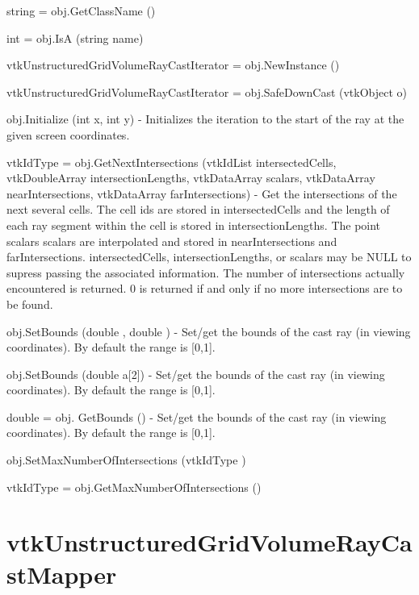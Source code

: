 \begin{DoxyItemize}
\item {\ttfamily string = obj.\-Get\-Class\-Name ()}  
\item {\ttfamily int = obj.\-Is\-A (string name)}  
\item {\ttfamily vtk\-Unstructured\-Grid\-Volume\-Ray\-Cast\-Iterator = obj.\-New\-Instance ()}  
\item {\ttfamily vtk\-Unstructured\-Grid\-Volume\-Ray\-Cast\-Iterator = obj.\-Safe\-Down\-Cast (vtk\-Object o)}  
\item {\ttfamily obj.\-Initialize (int x, int y)} -\/ Initializes the iteration to the start of the ray at the given screen coordinates.  
\item {\ttfamily vtk\-Id\-Type = obj.\-Get\-Next\-Intersections (vtk\-Id\-List intersected\-Cells, vtk\-Double\-Array intersection\-Lengths, vtk\-Data\-Array scalars, vtk\-Data\-Array near\-Intersections, vtk\-Data\-Array far\-Intersections)} -\/ Get the intersections of the next several cells. The cell ids are stored in {\ttfamily intersected\-Cells} and the length of each ray segment within the cell is stored in {\ttfamily intersection\-Lengths}. The point scalars {\ttfamily scalars} are interpolated and stored in {\ttfamily near\-Intersections} and {\ttfamily far\-Intersections}. {\ttfamily intersected\-Cells}, {\ttfamily intersection\-Lengths}, or {\ttfamily scalars} may be {\ttfamily N\-U\-L\-L} to supress passing the associated information. The number of intersections actually encountered is returned. 0 is returned if and only if no more intersections are to be found.  
\item {\ttfamily obj.\-Set\-Bounds (double , double )} -\/ Set/get the bounds of the cast ray (in viewing coordinates). By default the range is \mbox{[}0,1\mbox{]}.  
\item {\ttfamily obj.\-Set\-Bounds (double a\mbox{[}2\mbox{]})} -\/ Set/get the bounds of the cast ray (in viewing coordinates). By default the range is \mbox{[}0,1\mbox{]}.  
\item {\ttfamily double = obj. Get\-Bounds ()} -\/ Set/get the bounds of the cast ray (in viewing coordinates). By default the range is \mbox{[}0,1\mbox{]}.  
\item {\ttfamily obj.\-Set\-Max\-Number\-Of\-Intersections (vtk\-Id\-Type )}  
\item {\ttfamily vtk\-Id\-Type = obj.\-Get\-Max\-Number\-Of\-Intersections ()}  
\end{DoxyItemize}\hypertarget{vtkvolumerendering_vtkunstructuredgridvolumeraycastmapper}{}\section{vtk\-Unstructured\-Grid\-Volume\-Ray\-Cast\-Mapper}\label{vtkvolumerendering_vtkunstructuredgridvolumeraycastmapper}
